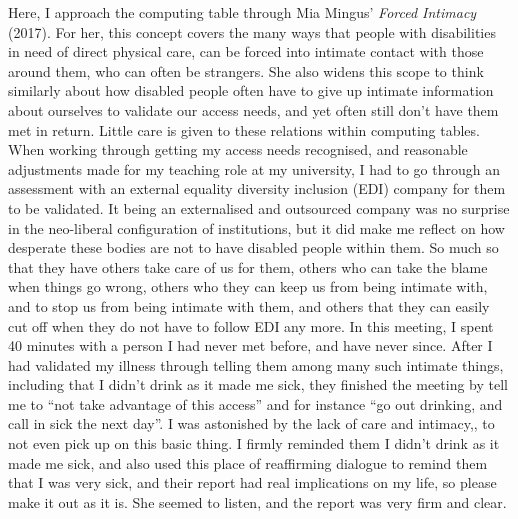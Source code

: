 Here, I approach the computing table through Mia Mingus' \emph{Forced
Intimacy} (2017). For her, this concept covers the many ways that people
with disabilities in need of direct physical care, can be forced into
intimate contact with those around them, who can often be strangers. She
also widens this scope to think similarly about how disabled people
often have to give up intimate information about ourselves to validate
our access needs, and yet often still don't have them met in return.
Little care is given to these relations within computing tables. When
working through getting my access needs recognised, and reasonable
adjustments made for my teaching role at my university, I had to go
through an assessment with an external equality diversity inclusion
(EDI) company for them to be validated. It being an externalised and
outsourced company was no surprise in the neo-liberal configuration of
institutions, but it did make me reflect on how desperate these bodies
are not to have disabled people within them. So much so that they have
others take care of us for them, others who can take the blame when
things go wrong, others who they can keep us from being intimate with,
and to stop us from being intimate with them, and others that they can
easily cut off when they do not have to follow EDI any more. In this
meeting, I spent 40 minutes with a person I had never met before, and
have never since. After I had validated my illness through telling them
among many such intimate things, including that I didn't drink as it
made me sick, they finished the meeting by tell me to ``not take
advantage of this access'' and for instance ``go out drinking, and call
in sick the next day''. I was astonished by the lack of care and
intimacy,, to not even pick up on this basic thing. I firmly reminded
them I didn't drink as it made me sick, and also used this place of
reaffirming dialogue to remind them that I was very sick, and their
report had real implications on my life, so please make it out as it is.
She seemed to listen, and the report was very firm and clear.

